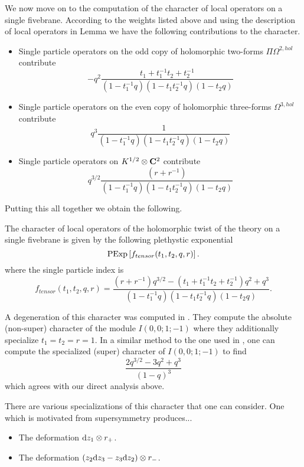 \documentclass[11pt]{amsart}
\begin{document}
\parsec

We now move on to the computation of the character of local operators on a single fivebrane.
According to the weights listed above and using the description of local operators in Lemma \label{lem:single} we have the following contributions to the character.

\begin{itemize}
\item Single particle operators on the odd copy of holomorphic two-forms $\Pi \Omega^{2,hol}$ contribute
\[
- q^2 \frac{t_1  + t_1^{-1} t_2  + t_2^{-1} }{(1-t_1^{-1}q) (1-t_1 t_2^{-1} q) (1-t_2 q)} 
\]
\item Single particle operators on the even copy of holomorphic three-forms $\Omega^{3,hol}$ contribute
\[
q^3 \frac{1}{(1-t_1^{-1}q) (1-t_1 t_2^{-1} q) (1-t_2 q)} 
\]
\item Single particle operators on $K^{1/2} \otimes \mathbf{C}^2$ contribute
\[
q^{3/2}\frac{(r + r^{-1})}{(1-t_1^{-1}q) (1-t_1 t_2^{-1} q) (1-t_2 q)}
\]
\end{itemize}

Putting this all together we obtain the following.

\begin{prop}
The character of local operators of the holomorphic twist of the theory on a single fivebrane is given by the following plethystic exponential
\[
{\rm PExp} \left[f_{tensor} (t_1,t_2,q,r) \right] .
\]
where the single particle index is
\[
f_{tensor} (t_1,t_2,q,r) = \frac{(r + r^{-1})q^{3/2} - (t_1 + t_1^{-1} t_2 + t_2^{-1} )q^2 + q^3}{(1-t_1^{-1}q) (1-t_1 t_2^{-1} q) (1-t_2 q)} .
\]
\end{prop}

\parsec

A degeneration of this character was computed in \cite{KR1}. 
They compute the absolute (non-super) character of the module $I(0,0;1;-1)$ where they additionally specialize $t_1=t_2=r=1$. 
In a similar method to the one used in \cite{KR1}, one can compute the specialized (super) character of $I(0,0;1;-1)$ to find
\[
\frac{2 q^{3/2} - 3 q^2 + q^3}{(1-q)^3}
\]
which agrees with our direct analysis above.

\parsec

There are various specializations of this character that one can consider. 
One which is motivated from supersymmetry produces...

\begin{itemize}
\item The deformation ${\rm d} z_1 \otimes r_+$.
\item The deformation $(z_2 {\rm d} z_3 - z_3 {\rm d} z_2) \otimes r_-$. 
\end{itemize}
\end{document}
